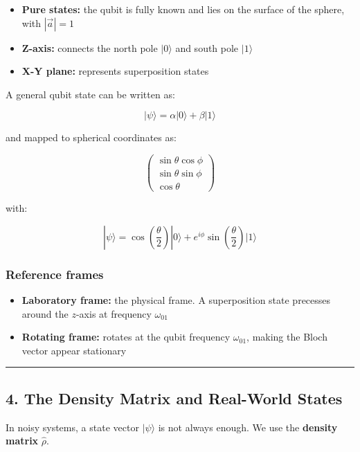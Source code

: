 \documentclass[
]{article}
\providecommand{\tightlist}{%
  \setlength{\itemsep}{0pt}\setlength{\parskip}{0pt}}
\begin{document}
\begin{itemize}
\tightlist
\item
  \textbf{Pure states:} the qubit is fully known and lies on the surface
  of the sphere, with \(|\vec{a}| = 1\)
\item
  \textbf{Z-axis:} connects the north pole \(|0\rangle\) and south pole
  \(|1\rangle\)
\item
  \textbf{X-Y plane:} represents superposition states
\end{itemize}

A general qubit state can be written as:

\[
|\psi\rangle = \alpha|0\rangle + \beta|1\rangle
\]

and mapped to spherical coordinates as:

\[
\begin{pmatrix}
\sin\theta \cos\phi \\
\sin\theta \sin\phi \\
\cos\theta
\end{pmatrix}
\]

with:

\[
|\psi\rangle = \cos\left(\frac{\theta}{2}\right)|0\rangle + e^{i\phi}\sin\left(\frac{\theta}{2}\right)|1\rangle
\]

\subsubsection{Reference frames}\label{reference-frames}

\begin{itemize}
\tightlist
\item
  \textbf{Laboratory frame:} the physical frame. A superposition state
  precesses around the \(z\)-axis at frequency \(\omega_{01}\)
\item
  \textbf{Rotating frame:} rotates at the qubit frequency
  \(\omega_{01}\), making the Bloch vector appear stationary
\end{itemize}

\begin{center}\rule{0.5\linewidth}{0.5pt}\end{center}

\subsection{4. The Density Matrix and Real-World
States}\label{the-density-matrix-and-real-world-states}

In noisy systems, a state vector \(|\psi\rangle\) is not always enough.
We use the \textbf{density matrix} \(\hat{\rho}\).
\end{document}
